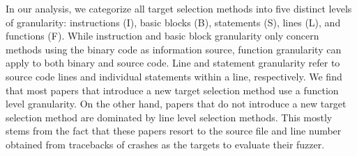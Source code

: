 In our analysis, we categorize all target selection methods into five distinct levels of granularity: instructions (I), basic blocks (B), statements (S), lines (L), and functions (F). While instruction and basic block granularity only concern methods using the binary code as information source, function granularity can apply to both binary and source code. Line and statement granularity refer to source code lines and individual statements within a line, respectively.
%
We find that most papers that introduce a new target selection method use a function level granularity. On the other hand, papers that do not introduce a new target selection method are dominated by line level selection methods. This mostly stems from the fact that these papers resort to the source file and line number obtained from tracebacks of crashes as the targets to evaluate their fuzzer.    
\cend